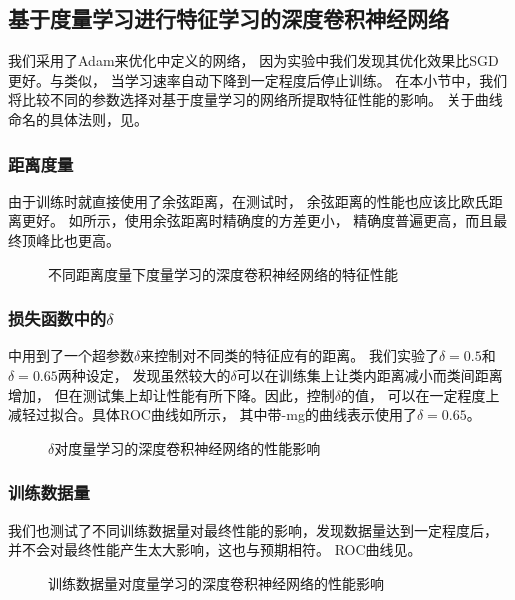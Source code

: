 \subsection{基于度量学习进行特征学习的深度卷积神经网络}
我们采用了Adam\cite{kingma2014adam}来优化中定义的网络，
因为实验中我们发现其优化效果比SGD更好。与类似，
当学习速率自动下降到一定程度后停止训练。
在本小节中，我们将比较不同的参数选择对基于度量学习的网络所提取特征性能的影响。
关于曲线命名的具体法则，见。

\subsubsection{距离度量}
由于训练时就直接使用了余弦距离，在测试时，
余弦距离的性能也应该比欧氏距离更好。
如所示，使用余弦距离时精确度的方差更小，
精确度普遍更高，而且最终顶峰比也更高。

\begin{figure}[H]
    \caption{不同距离度量下度量学习的深度卷积神经网络的特征性能}
    \label{fig:expr:curve:mtrc:measure}
\end{figure}

\subsubsection{损失函数中的$\delta$}
中用到了一个超参数$\delta$来控制对不同类的特征应有的距离。
我们实验了$\delta=0.5$和$\delta=0.65$两种设定，
发现虽然较大的$\delta$可以在训练集上让类内距离减小而类间距离增加，
但在测试集上却让性能有所下降。因此，控制$\delta$的值，
可以在一定程度上减轻过拟合。具体ROC曲线如所示，
其中带-mg的曲线表示使用了$\delta=0.65$。

\begin{figure}[H]
    \caption{$\delta$对度量学习的深度卷积神经网络的性能影响}
    \label{fig:expr:curve:mtrc:delta}
\end{figure}

\subsubsection{训练数据量}
我们也测试了不同训练数据量对最终性能的影响，发现数据量达到一定程度后，
并不会对最终性能产生太大影响，这也与预期相符。
ROC曲线见。
\begin{figure}[H]
    \caption{训练数据量对度量学习的深度卷积神经网络的性能影响}
    \label{fig:expr:curve:mtrc:datasize}
\end{figure}

